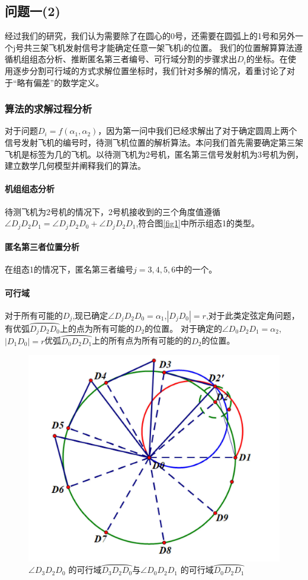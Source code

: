 \documentclass[withoutpreface,bwprint]{cumcmthesis} %
\begin{document}
		\subsection{问题一(2)}
			经过我们的研究，我们认为需要除了在圆心的0号，还需要在圆弧上的1号和另外一个j号共三架飞机发射信号才能确定任意一架飞机i的位置。
			我们的位置解算算法遵循机组组态分析、推断匿名第三者编号、可行域分割的步骤求出$D_i$的坐标。在使用逐步分割可行域的方式求解位置坐标时，我们针对多解的情况，着重讨论了对于“略有偏差”的数学定义。
			\subsubsection{算法的求解过程分析}
			对于问题$D_i = f(\alpha_1, \alpha_2)$，因为第一问中我们已经求解出了对于确定圆周上两个信号发射飞机的编号时，待测飞机位置的解析算法。本问我们首先需要确定第三架飞机是标签为几的飞机。以待测飞机为2号机，匿名第三信号发射机为3号机为例，建立数学几何模型并阐释我们的算法。
			\paragraph{机组组态分析}
			待测飞机为2号机的情况下，2号机接收到的三个角度值遵循$\angle D_jD_2D_1 =\angle D_jD_2D_0 + \angle D_jD_2D_1$,符合图\ref{fig1}中所示组态1的类型。
			\paragraph{匿名第三者位置分析}
			在组态1的情况下，匿名第三者编号$j=3,4,5,6$中的一个。
			\paragraph{可行域}
			对于所有可能的$D_j$,现已确定$\angle D_jD_2D_0 = \alpha_1$,$|D_jD_0|= r$,对于此类定弦定角问题，有优弧$\wideparen{D_jD_2D_0}$上的点为所有可能的$D_2$的位置。
			对于确定的$\angle D_0D_2D_1 = \alpha_2$,$|D_1D_0|= r$优弧$\wideparen{D_0D_2D_1}$上的所有点为所有可能的的$D_2$的位置。
			\begin{figure}[htb]
				\centering
				\includegraphics[width=0.5\linewidth]{./figures/3}
				\caption{$\angle D_3D_2D_0$ 的可行域$\wideparen{D_3D_2D_0}$与$\angle D_0D_2D_1$ 的可行域$\wideparen{D_0D_2D_1}$}
				\label{fig3}
			\end{figure}
		
\end{document}

